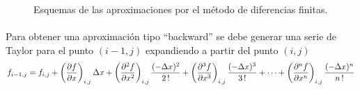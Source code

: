 \documentclass[letterpaper, openright, 12pt]{book}
\begin{document}
    \begin{figure}[htbp!]
        \centering
        \caption[Aproximaciones por Diferencias Finitas]{Esquemas de las aproximaciones por el método de diferencias finitas.\cite{chapra}}
    \end{figure}

\paragraph*{}
    Para obtener una aproximación tipo ``backward'' se debe generar una serie de Taylor para el punto $(i-1, j)$ expandiendo a partir del punto $(i, j)$
    \begin{equation}
    f_{i-1, j} = f_{i,j} + \left( \pdv{f}{x}\right)_{i,j} \Delta x + \left( \pdv[2]{f}{x} \right)_{i,j} \frac{(-\Delta x)^2 }{2\,!}  + \left( \pdv[3]{f}{x} \right)_{i,j} \frac{(-\Delta x)^3}{3\,!} + \dotsb + \left( \pdv[n]{f}{x} \right)_{i,j} \frac{(-\Delta x)^n}{n\,!}
    \label{taylor-backward}
    \end{equation}
\end{document}
